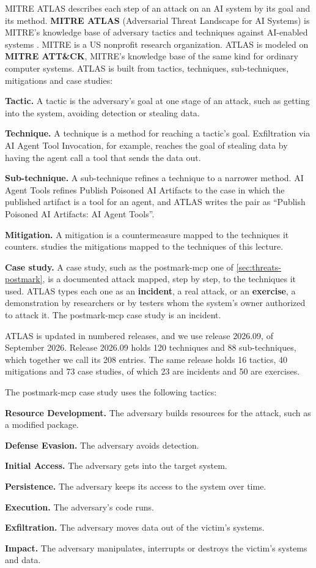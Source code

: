 MITRE ATLAS describes each step of an attack on an AI system by its goal and its method.
\textbf{MITRE ATLAS} (Adversarial Threat Landscape for AI Systems) is MITRE's knowledge base of
adversary tactics and techniques against AI-enabled systems \citep{mitre-atlas-2026}. MITRE is a
US nonprofit research organization. ATLAS is modeled on \textbf{MITRE ATT\&CK}, MITRE's knowledge
base of the same kind for ordinary computer systems. ATLAS is built from tactics, techniques,
sub-techniques, mitigations and case studies:
\bi
\item \textbf{Tactic.} A tactic is the adversary's goal at one stage of an attack, such as getting
into the system, avoiding detection or stealing data.
\item \textbf{Technique.} A technique is a method for reaching a tactic's goal. Exfiltration via AI
Agent Tool Invocation, for example, reaches the goal of stealing data by having the agent call a
tool that sends the data out.
\item \textbf{Sub-technique.} A sub-technique refines a technique to a narrower method. AI Agent
Tools refines Publish Poisoned AI Artifacts to the case in which the published artifact is a tool
for an agent, and ATLAS writes the pair as ``Publish Poisoned AI Artifacts: AI Agent Tools''.
\item \textbf{Mitigation.} A mitigation is a countermeasure mapped to the techniques it counters.
 studies the mitigations mapped to the techniques of this lecture.
\item \textbf{Case study.} A case study, such as the postmark-mcp one of
\cref{sec:threats-postmark}, is a documented attack mapped, step by step, to the techniques it
used. ATLAS types each one as an \textbf{incident}, a real attack, or an \textbf{exercise}, a
demonstration by researchers or by testers whom the system's owner authorized to attack it. The
postmark-mcp case study is an incident.
\ei

ATLAS is updated in numbered releases, and we use release 2026.09, of September 2026. Release
2026.09 holds 120 techniques and 88 sub-techniques, which together we call its 208 entries. The
same release holds 16 tactics, 40 mitigations and 73 case studies, of which 23 are incidents and 50
are exercises.

The postmark-mcp case study uses the following tactics:
\bi
\item \textbf{Resource Development.} The adversary builds resources for the attack, such as a
modified package.
\item \textbf{Defense Evasion.} The adversary avoids detection.
\item \textbf{Initial Access.} The adversary gets into the target system.
\item \textbf{Persistence.} The adversary keeps its access to the system over time.
\item \textbf{Execution.} The adversary's code runs.
\item \textbf{Exfiltration.} The adversary moves data out of the victim's systems.
\item \textbf{Impact.} The adversary manipulates, interrupts or destroys the victim's systems and
data.
\ei

